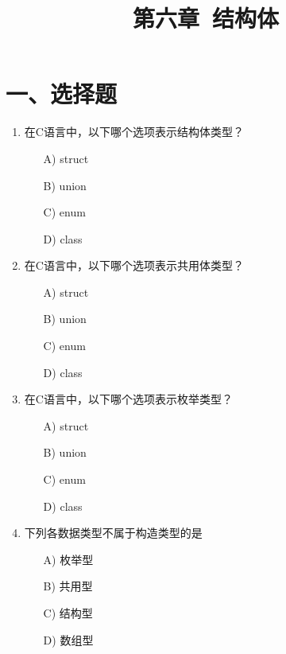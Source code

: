 \documentclass[a4paper,12pt]{article}
\title{\textbf{第六章\ 结构体}}
\author{}
\date{}
\begin{document}
\maketitle

\section*{一、选择题}

\begin{enumerate}
	\item 在C语言中，以下哪个选项表示结构体类型？
	      \begin{enumerate}
		      \item[A)] struct
		      \item[B)] union
		      \item[C)] enum
		      \item[D)] class
	      \end{enumerate}
	      \vspace{0.3cm}

	\item 在C语言中，以下哪个选项表示共用体类型？
	      \begin{enumerate}
		      \item[A)] struct
		      \item[B)] union
		      \item[C)] enum
		      \item[D)] class
	      \end{enumerate}
	      \vspace{0.3cm}

	\item 在C语言中，以下哪个选项表示枚举类型？
	      \begin{enumerate}
		      \item[A)] struct
		      \item[B)] union
		      \item[C)] enum
		      \item[D)] class
	      \end{enumerate}
	      \vspace{0.3cm}

	\item 下列各数据类型不属于构造类型的是
	      \begin{enumerate}
		      \item[A)] 枚举型
		      \item[B)] 共用型
		      \item[C)] 结构型
		      \item[D)] 数组型
	      \end{enumerate}
	      \vspace{0.3cm}


\end{enumerate}
\end{document}
